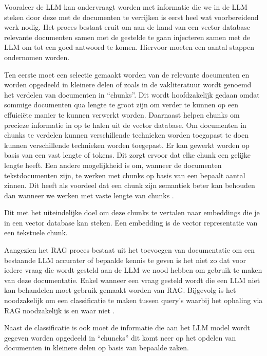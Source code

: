     Vooraleer de LLM kan ondervraagt worden met informatie die we in de LLM steken door deze met de documenten te verrijken is eerst heel wat voorbereidend werk nodig. Het proces bestaat eruit om aan de hand van een vector database relevante documenten samen met de gestelde te gaan injecteren samen met de LLM om tot een goed antwoord te komen. Hiervoor moeten een aantal stappen ondernomen worden.
    
    Ten eerste moet een selectie gemaakt worden van de relevante documenten en worden opgedeeld in kleinere delen of zoals in de vakliteratuur wordt genoemd het verdelen van documenten in “chunks”. Dit wordt hoofdzakelijk gedaan omdat sommige documenten qua lengte te groot zijn om verder te kunnen op een effuiciëte manier te kunnen verwerkt worden. Daarnaast helpen chunks om precieze informatie in op te halen uit de vector database.  Om documenten in chunks te verdelen kunnen verschillende technieken worden toegapast te doen kunnen verschillende technieken worden toegepast. Er kan gewerkt worden op basis van een vast lengte of tokens. Dit zorgt ervoor dat elke chunk een gelijke lengte heeft. Een andere mogelijkheid is om, wanneer de documenten tekstdocumenten zijn, te werken met chunks op basis van een bepaalt aantal zinnen. Dit heeft als voordeel dat een chunk zijn semantiek beter kan behouden dan wanneer we werken met vaste lengte van chunks \autocite{Wang2024}.
    
    Dit met het uiteindelijke doel om deze chunks te vertalen naar embeddings die je in een vector database kan steken. Een embedding is de vector representatie van een tekstuele chunk. 
    
    Aangezien het RAG proces bestaat uit het toevoegen van documentatie om een bestaande LLM accurater of bepaalde kennis te geven is het niet zo dat voor iedere vraag die wordt gesteld aan de LLM we nood hebben om gebruik te maken van deze documentatie. Enkel wanneer een vraag gesteld wordt die een LLM niet kan behandelen moet gebruik gemaakt worden van RAG. Bijgevolg is het noodzakelijk om een classificatie te maken tussen query's waarbij het ophaling via RAG noodzakelijk is en waar niet \autocite{Wang2024}.
    
    Naast de classificatie is ook moet de informatie die aan het LLM model wordt gegeven worden opgedeeld in “chuncks” dit komt neer op het opdelen van documenten in kleinere delen op basis van bepaalde zaken. 

